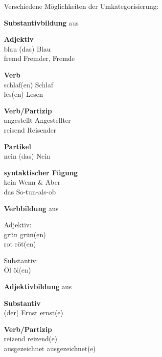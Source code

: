 \begin{frame}

Verschiedene Möglichkeiten der Umkategorisierung:

\medskip 

\begin{minipage}[t][][t]{.47\textwidth}

\textbf{Substantivbildung} aus

\ea \textbf{Adjektiv}\\
blau \ras (das) Blau\\
fremd \ras {}Fremder, Fremde

\ex \textbf{Verb}\\
schlaf(en) \ras {}Schlaf \\
les(en) \ras  {}Lesen

\ex \textbf{Verb/Partizip}\\
angestellt \ras {}Angestellter\\ 
reisend \ras   {}Reisender

\ex \textbf{Partikel}\\
nein \ras  (das)  Nein

\ex \textbf{syntaktischer Fügung}\\
kein Wenn \& Aber\\
das So-tun-als-ob
\z

\end{minipage}
\pause 
\hfill 
\begin{minipage}[t][][t]{.51\textwidth}
\textbf{Verbbildung} aus 

\ea Adjektiv:\\
grün \ras  {}grün(en)\\ 
rot \ras  {}röt(en)

\ex Substantiv:\\
Öl \ras  {}öl(en)
\z

\pause 
\medskip 

\textbf{Adjektivbildung} aus

\ea \textbf{Substantiv}\\
(der) Ernst \ras  {}ernst(e)

\ex \textbf{Verb/Partizip}\\
reizend \ras  {}reizend(e) \\
ausgezeichnet \ras  {}ausgezeichnet(e)
\z


\end{minipage}

\end{frame}


